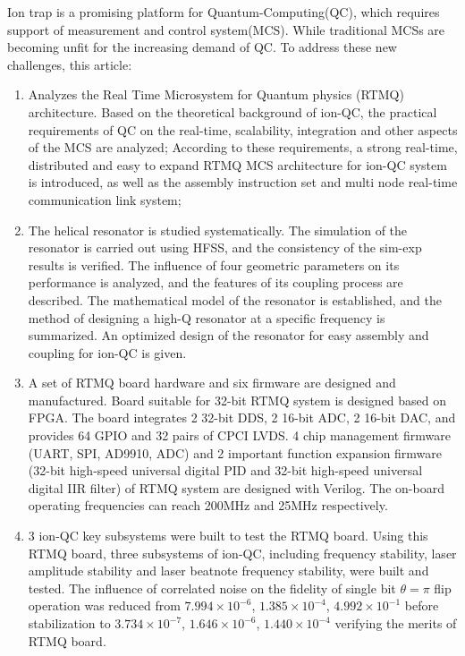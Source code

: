 \begin{abstract*}
  Ion trap is a promising platform for Quantum-Computing(QC), which requires support of measurement and control system(MCS). 
  While traditional MCSs are becoming unfit for the increasing demand of QC. To address these new challenges, this article: 
  \begin{enumerate}
    \item Analyzes the Real Time Microsystem for Quantum physics (RTMQ) architecture. Based on the theoretical background of ion-QC, the practical requirements of QC on the real-time, scalability, integration and other aspects of the MCS are analyzed; According to these requirements, a strong real-time, distributed and easy to expand RTMQ MCS architecture for ion-QC system is introduced, as well as the assembly instruction set and multi node real-time communication link system;
    \item The helical resonator is studied systematically. The simulation of the resonator is carried out using HFSS, and the consistency of the sim-exp results is verified. The influence of four geometric parameters on its performance is analyzed, and the features of its coupling process are described. The mathematical model of the resonator is established, and the method of designing a high-Q resonator at a specific frequency is summarized. An optimized design of the resonator for easy assembly and coupling for ion-QC is given.
    \item A set of RTMQ board hardware and six firmware are designed and manufactured. Board suitable for 32-bit RTMQ system is designed based on FPGA. The board integrates 2 32-bit DDS, 2 16-bit ADC, 2 16-bit DAC, and provides 64 GPIO and 32 pairs of CPCI LVDS. 4 chip management firmware (UART, SPI, AD9910, ADC) and 2 important function expansion firmware (32-bit high-speed universal digital PID and 32-bit high-speed universal digital IIR filter) of RTMQ system are designed with Verilog. The on-board operating frequencies can reach 200MHz and 25MHz respectively.
    \item 3 ion-QC key subsystems were built to test the RTMQ board. Using this RTMQ board, three subsystems of ion-QC, including frequency stability, laser amplitude stability and laser beatnote frequency stability, were built and tested. The influence of correlated noise on the fidelity of single bit $\theta=\pi$ flip operation was reduced from $7.994\times10 ^ {-6}$, $1.385\times 10 ^ {-4}$, $4.992\times 10 ^ {-1}$ before stabilization to $3.734\times10 ^ {-7}$, $1.646\times 10 ^ {-6}$, $1.440\times 10^ {-4}$ verifying the merits of RTMQ board.
  \end{enumerate}
  

\end{abstract*}
